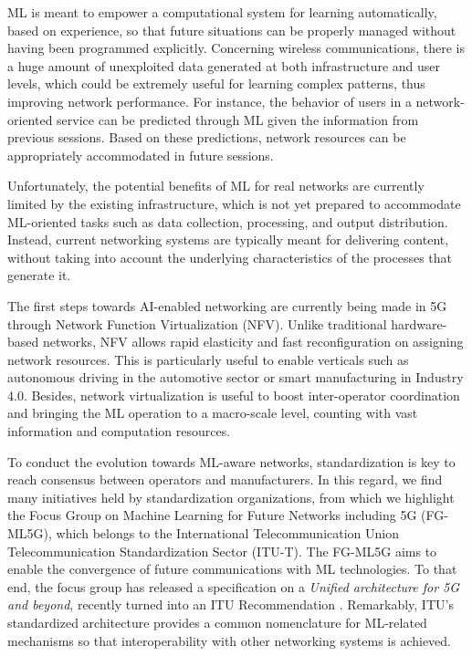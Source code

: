 \documentclass{article}
\begin{document}
ML is meant to empower a computational system for learning automatically, based on experience, so that future situations can be properly managed without having been programmed explicitly. Concerning wireless communications, there is a huge amount of unexploited data generated at both infrastructure and user levels, which could be extremely useful for learning complex patterns, thus improving network performance. For instance, the behavior of users in a network-oriented service can be predicted through ML given the information from previous sessions. Based on these predictions, network resources can be appropriately accommodated in future sessions.

Unfortunately, the potential benefits of ML for real networks are currently limited by the existing infrastructure, which is not yet prepared to accommodate ML-oriented tasks such as data collection, processing, and output distribution. Instead, current networking systems are typically meant for delivering content, without taking into account the underlying characteristics of the processes that generate it.

The first steps towards AI-enabled networking are currently being made in 5G through Network Function Virtualization (NFV). Unlike traditional hardware-based networks, NFV allows rapid elasticity and fast reconfiguration on assigning network resources. This is particularly useful to enable verticals such as autonomous driving in the automotive sector or smart manufacturing in Industry 4.0. Besides, network virtualization is useful to boost inter-operator coordination and bringing the ML operation to a macro-scale level, counting with vast information and computation resources. 

To conduct the evolution towards ML-aware networks, standardization is key to reach consensus between operators and manufacturers. In this regard, we find many initiatives held by standardization organizations, from which we highlight the Focus Group on Machine Learning for Future Networks including 5G (FG-ML5G), which belongs to the International Telecommunication Union Telecommunication Standardization Sector (ITU-T). The FG-ML5G aims to enable the convergence of future communications with ML technologies. To that end, the focus group has released a specification on a \emph{Unified architecture for 5G and beyond}, recently turned into an ITU Recommendation \cite{itu2019architecture}. Remarkably, ITU's standardized architecture provides a common nomenclature for ML-related mechanisms so that interoperability with other networking systems is achieved. 
\end{document}
